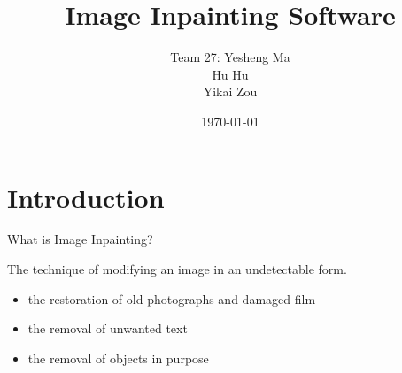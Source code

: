 \documentclass{beamer}
\title{Image Inpainting Software}
\author{Team 27: Yesheng Ma\\\hspace{0.9cm}Hu Hu\\\hspace{1.4cm}Yikai Zou}
\institute[SJTU]{}
\date{\today}
\begin{document}
\begin{frame}
\titlepage
\end{frame}



\section{Introduction}
\begin{frame}{What is Image Inpainting?}
\begin{definition}[Inpainting]
The technique of modifying an image in an undetectable form.
\end{definition}
\begin{itemize}
\item the restoration of old photographs and damaged film
\item the removal of unwanted text
\item the removal of objects in purpose
\end{itemize}

\begin{figure}
  \centering
  \qquad
\end{figure}
\end{frame}
\end{document}

